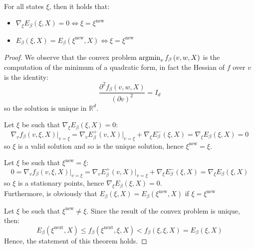 \begin{theorem} \\
    \label{th:statonary_points}
    For all states $\xi$, then it holds that:
    \begin{itemize}[itemsep=2pt, topsep=10pt]
        \item $\nabla_{\xi}E_{\beta}\left(\xi,X\right) = 0 \iff \xi = \xi^{\text{new}}$
        \item $E_{\beta}\left(\xi,X\right) = E_{\beta}\left(\xi^{\text{new}},X\right)\iff\xi = \xi^{\text{new}}$
    \end{itemize}
    \begin{proof}
        We observe that the convex problem $\operatorname{argmin}_v f_{\beta}\left(v,w,X\right)$ is the computation of the minimum of a quadratic form, in fact the Hessian of $f$ over $v$ is the identity:
        \[
        \frac{\partial^2 f_{\beta}\left(v,w,X\right)}{\left(\partial v\right)^2} = I_d
        \]
        so the solution is unique in $\mathbb{R}^d$.

        \noindent Let $\xi$ be such that $\nabla_{\xi}E_{\beta}\left(\xi,X\right) = 0$:
        \[
            \nabla_v f_{\beta}\left(v,\xi,X\right)\big|_{v=\xi}=\nabla_v E_{\beta}^{+}\left(v,X\right)\big|_{v=\xi}+\nabla_{\xi} E_{\beta}^{-}\left(\xi,X\right) = \nabla_\xi E_{\beta}\left(\xi,X\right) = 0
        \]
        so $\xi$ is a valid solution and so is the unique solution, hence $\xi^{\text{new}} = \xi$.

        \noindent Let $\xi$ be such that $\xi^{\text{new}} = \xi$:
        \[
            0 = \nabla_v f_{\beta}\left(v,\xi,X\right)\big|_{v=\xi}=\nabla_v E_{\beta}^{+}\left(v,X\right)\big|_{v=\xi}+\nabla_{\xi} E_{\beta}^{-}\left(\xi,X\right) = \nabla_\xi E_{\beta}\left(\xi,X\right)
        \]
        so $\xi$ is a stationary points, hence $\nabla_\xi E_{\beta}\left(\xi,X\right) = 0$.\\ Furthermore, is obviously that $E_{\beta}\left(\xi,X\right) = E_{\beta}\left(\xi^{\text{new}},X\right)$ if $\xi = \xi^{\text{new}}$

        \noindent Let $\xi$ be such that $\xi^{\text{new}} \neq \xi$. Since the result of the convex problem is unique, then:
        \[
            E_{\beta}\left(\xi^{\text{next}},X\right) \leq f_{\beta}\left(\xi^{\text{next}},\xi,X\right) < f_{\beta}\left(\xi,\xi,X\right) = E_{\beta}\left(\xi,X\right)
        \]
        Hence, the statement of this theorem holds.
    \end{proof}
\end{theorem}
